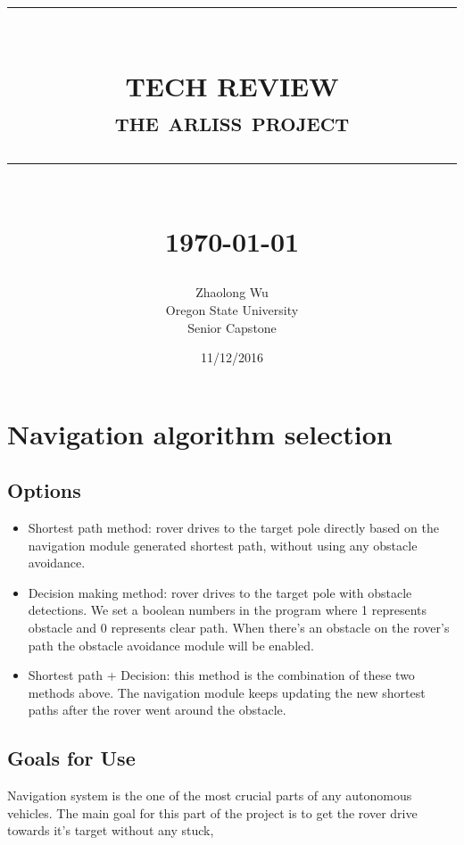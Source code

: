 \documentclass[10pt,serif,draftclsnofoot,onecolumn]{IEEEtran}
\newcommand{\HRule}[1]{\rule{\linewidth}{#1}}
\begin{document}
	\begin{titlepage}
	  \title{ \normalsize \textsc{}
	    \\ [2.0cm]
	    \HRule{0.5pt} \\
	    \LARGE \textbf{\uppercase{Tech Review}}
	    \\ \normalsize \textsc{the arliss project}
	    \HRule{2pt} \\ [0.5cm]
	    \normalsize \today \vspace*{5\baselineskip}}
	 \date{11/12/2016}
	  
	  \author{Zhaolong Wu \\
	    Oregon State University \\
	    Senior Capstone}
	  \maketitle
	\end{titlepage}

\newpage
{}

\section{Navigation algorithm selection}

\subsection{Options}
\begin{itemize}
	\item Shortest path method: rover drives to the target pole directly based on the navigation module generated shortest path, without using any obstacle avoidance.
	
	\item Decision making method: rover drives to the target pole with obstacle detections. We set a boolean numbers in the program where 1 represents obstacle and 0 represents clear path. When there's an obstacle on the rover's path the obstacle avoidance module will be enabled. \cite{Autonomous Autonavigation Robot}
	
	\item Shortest path + Decision: this method is the combination of these two methods above. The navigation module keeps updating the new shortest paths after the rover went around the obstacle.\cite{Autonomous Vehicle Navigation and Mapping System}
\end{itemize}
\subsection{Goals for Use}
Navigation system is the one of the most crucial parts of any autonomous vehicles. The main goal for this part of the project is to get the rover drive towards it's target without any stuck,   
\end{document}
